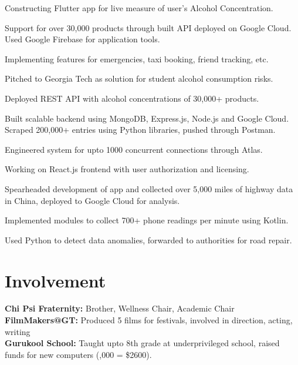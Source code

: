 \documentclass[]{saumya-resume}
\begin{document}
\begin{minipage}[t]{0.66\textwidth}
\begin{tightemize}
\item Constructing Flutter app for live measure of user's Alcohol Concentration.
\item Support for over 30,000 products through built API deployed on Google Cloud. Used Google Firebase for application tools.
\item Implementing features for emergencies, taxi booking, friend tracking, etc.
\item Pitched to Georgia Tech as solution for student alcohol consumption risks.
\end{tightemize}
\sectionsep

\begin{tightemize}
\item Deployed REST API with alcohol concentrations of 30,000+ products.
\item Built scalable backend using MongoDB, Express.js, Node.js and Google Cloud. Scraped 200,000+ entries using Python libraries, pushed through Postman.
\item Engineered system for upto 1000 concurrent connections through Atlas.
\item Working on React.js frontend with user authorization and licensing.
\end{tightemize}
\sectionsep

\begin{tightemize}
\item Spearheaded development of app and collected over 5,000 miles of highway data in China, deployed to Google Cloud for analysis.
\item Implemented modules to collect 700+ phone readings per minute using Kotlin.
\item Used Python to detect data anomalies, forwarded to authorities for road repair.
\end{tightemize}
\sectionsep


\section{Involvement} 
{\bf Chi Psi Fraternity:} Brother, Wellness Chair, Academic Chair \\
\vskip 0.05in
{\bf FilmMakers@GT:} Produced 5 films for festivals, involved in direction, acting, writing\\
\vskip 0.05in
{\bf Gurukool School:} Taught upto 8th grade at underprivileged school, raised funds for new computers (,000 = \$2600).
\sectionsep

\end{minipage} 
\end{document}
